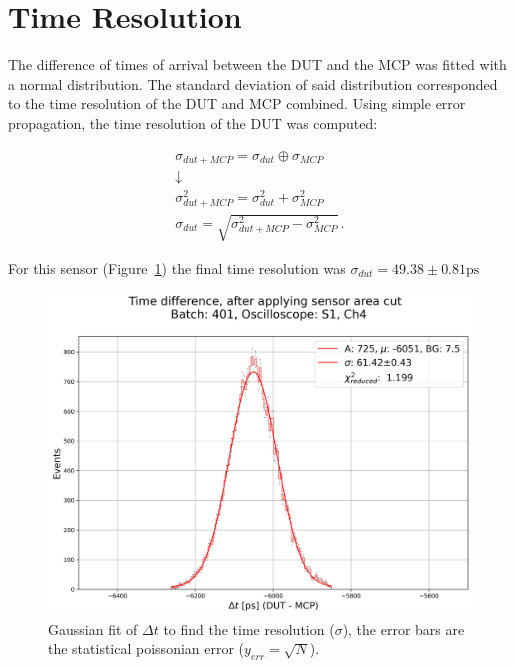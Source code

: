 \section{Time Resolution}\label{sec:methods_time_resolution}

The difference of times of arrival between the DUT and the MCP was fitted with a normal distribution. The standard deviation of said distribution corresponded to the time resolution of the DUT and MCP combined. Using simple error propagation, the time resolution of the DUT was computed: 

\begin{equation*}
    \begin{gathered}
    \sigma_{dut+MCP} = \sigma_{dut} \oplus \sigma_{MCP} \\
    \downarrow \\
    \sigma_{dut+MCP}^2 = \sigma_{dut}^2 + \sigma_{MCP}^2 \\
    \sigma_{dut} = \sqrt{\sigma_{dut+MCP}^2-\sigma_{MCP}^2}  \, .
    \end{gathered}
\end{equation*}

For this sensor (Figure~\ref{fig:time_resolution_plot}) the final time resolution was \(\sigma_{dut} = 49.38\pm0.81\si{\ps} \)

\begin{figure}[h!tbp]
    \centering
    \includegraphics[width=0.7\linewidth]{Images/time_resolution_plots/time_difference_401_S1_zoomed_and_gauss_fit_with_cuts_central_area_DUTs_3.png}
    \captionsetup{width=\captionwidth}
    \caption{Gaussian fit of \(\Delta t\) to find the time resolution (\(\sigma\)), the error bars are the statistical poissonian error (\(y_{err}=\sqrt{N}\)).}
    \label{fig:time_resolution_plot}
\end{figure}


